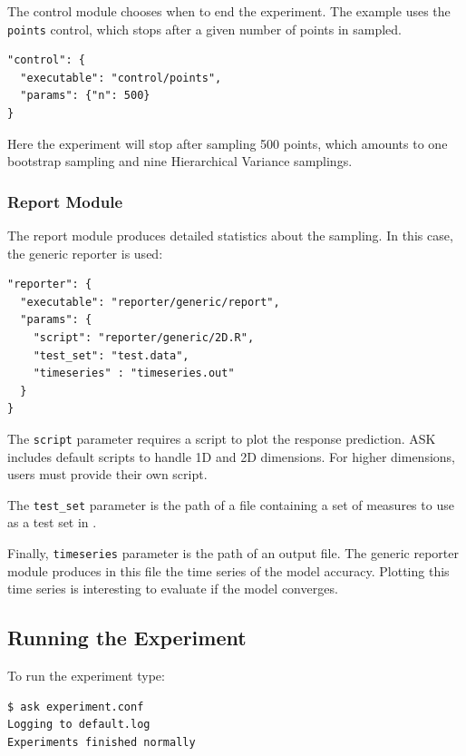 The control module chooses when to end the experiment. The example uses the \texttt{points} control, which stops after a given number of points in sampled.

\begin{verbatim}
"control": {
  "executable": "control/points",
  "params": {"n": 500}
}
\end{verbatim}

Here the experiment will stop after sampling 500 points, which amounts to one bootstrap sampling and nine Hierarchical Variance samplings.

\subsubsection{Report Module}

The report module produces detailed statistics about the sampling.
In this case, the generic reporter is used:

\begin{verbatim}
"reporter": {
  "executable": "reporter/generic/report",
  "params": {
    "script": "reporter/generic/2D.R",
    "test_set": "test.data",
    "timeseries" : "timeseries.out"
  }
}
\end{verbatim}

The \texttt{script} parameter requires a script to plot the response prediction. ASK includes default scripts to handle 1D and 2D dimensions.
For higher dimensions, users must provide their own script.

The \texttt{test\_set} parameter is the path of a file containing a set of measures to use as a test set in .

Finally, \texttt{timeseries} parameter is the path of an output file. The generic reporter module produces in this file the time series of the model accuracy. Plotting this time series is interesting to evaluate if the model converges.

\subsection{Running the Experiment}

To run the experiment type:

\begin{verbatim}
$ ask experiment.conf
Logging to default.log
Experiments finished normally
\end{verbatim}

